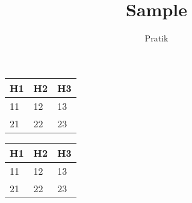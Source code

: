 \documentclass[12pt]{article}
\begin{document}
\title{Sample}
\author{Pratik}\maketitle

\begin{tabular}{| l | l | l |}
\hline
H1 & H2 & H3 \\
\hline
11 & 12 & 13 \\
21 & 22 & 23 \\
\hline
\end{tabular}

\begin{tabular}{| l | l | l |}
\hline
H1 & H2 & H3 \\
\hline
11 & 12 & 13 \\
21 & 22 & 23 \\
\hline
\end{tabular}
\end{document}
